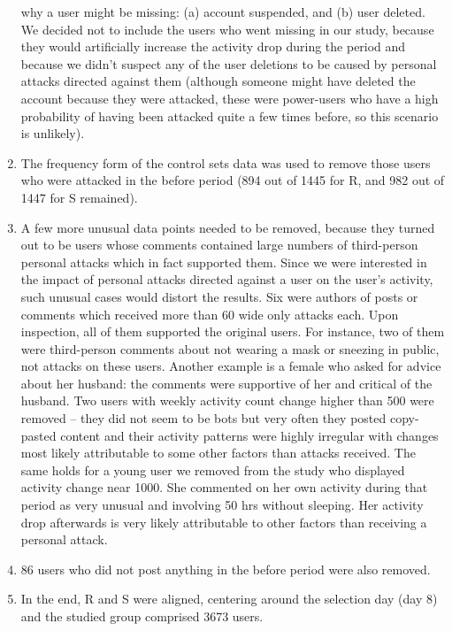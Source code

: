 \documentclass[10pt,]{scrartcl}
\begin{document}
\begin{enumerate}
  why a user might be missing: (a) account suspended, and (b) user
  deleted. We decided not to include the users who went missing in our
  study, because they would artificially increase the activity drop
  during the period and because we didn't suspect any of the user
  deletions to be caused by personal attacks directed against them
  (although someone might have deleted the account because they were
  attacked, these were power-users who have a high probability of having
  been attacked quite a few times before, so this scenario is unlikely).
\item
  The frequency form of the control sets data was used to remove those
  users who were attacked in the \textsf{before} period (894 out of 1445
  for \textsf{R}, and 982 out of 1447 for \textsf{S} remained).
\item
  A few more unusual data points needed to be removed, because they
  turned out to be users whose comments contained large numbers of
  third-person personal attacks which in fact supported them. Since we
  were interested in the impact of personal attacks directed against a
  user on the user's activity, such unusual cases would distort the
  results. Six were authors of posts or comments which received more
  than 60 \textsf{wide only} attacks each. Upon inspection, all of them
  supported the original users. For instance, two of them were
  third-person comments about not wearing a mask or sneezing in public,
  not attacks on these users. Another example is a female who asked for
  advice about her husband: the comments were supportive of her and
  critical of the husband. Two users with weekly activity count change
  higher than 500 were removed -- they did not seem to be bots but very
  often they posted copy-pasted content and their activity patterns were
  highly irregular with changes most likely attributable to some other
  factors than attacks received. The same holds for a young user we
  removed from the study who displayed activity change near 1000. She
  commented on her own activity during that period as very unusual and
  involving 50 hrs without sleeping. Her activity drop afterwards is
  very likely attributable to other factors than receiving a personal
  attack.
\item
  86 users who did not post anything in the \textsf{before} period were
  also removed.
\item
  In the end, \textsf{R} and \textsf{S} were aligned, centering around
  the selection day (day 8) and the studied group comprised 3673 users.
\end{enumerate}
\end{document}
